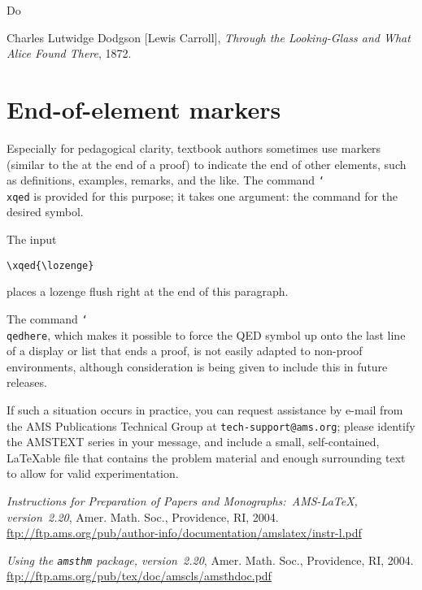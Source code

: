 \documentclass[multixcb]{amstext-l}
\theoremstyle{plain}
\theoremstyle{definition}
\newcommand{\cs}[1]{\texttt{\char`\\#1}}
\newenvironment{exm}{%
  \par
  \begingroup
    \parindent0pt
    \leftskip2\normalparindent
    \obeylines
}{%
    \par
  \endgroup
}
\begin{document}
\renewcommand{\bibname}{References for this chapter}
\begin{inchapterbibliography}{Do}

 Charles Lutwidge Dodgson [Lewis Carroll],
  \textit{Through the Looking-Glass and What Alice Found There}, 1872.

\end{inchapterbibliography}

\section{End-of-element markers}

Especially for pedagogical clarity, textbook authors sometimes use
markers (similar to the {\qedsymbol} at the end of a proof) to
indicate the end of other elements, such as definitions, examples,
remarks, and the like.  The command \cs{xqed} is provided for this
purpose; it takes one argument: the command for the desired symbol.

The input\par\nobreak
\begin{exm}
\verb+\xqed{\lozenge}+
\end{exm}
\noindent
places a lozenge flush right at the end of this paragraph.
\xqed{\lozenge}

The command \cs{qedhere}, which makes it possible to force the
QED symbol up onto the last line of a display or list that ends
a proof, is not easily adapted to non-proof environments, although
consideration is being given to include this in future releases.

If such a situation occurs in practice, you can request assistance
by e-mail from the AMS Publications Technical Group at
\texttt{tech-support@ams.org}; please identify the AMSTEXT series
in your message, and include a small, self-contained, {\LaTeX}able
file that contains the problem material and enough surrounding
text to allow for valid experimentation.



\renewcommand{\bibname}{Bibliography}
\begin{thebibliography}{INSTR}

 \textit{Instructions for Preparation of
  Papers and Monographs:\ AMS-\LaTeX, version~\textup{2.20}},
  Amer. Math. Soc., Providence, RI, 2004.
  \url{ftp://ftp.ams.org/pub/author-info/documentation/amslatex/instr-l.pdf}

 \textit{Using the \texttt{amsthm} package,
  version~\textup{2.20}}, Amer. Math. Soc., Providence, RI, 2004.
  \url{ftp://ftp.ams.org/pub/tex/doc/amscls/amsthdoc.pdf}

\end{thebibliography}
\end{document}
